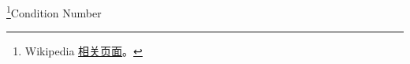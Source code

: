 
\begin{issues}
\issueDraft
\end{issues}

\footnote{Wikipedia \href{https://en.wikipedia.org/wiki/Condition_number}{相关页面}。}Condition Number